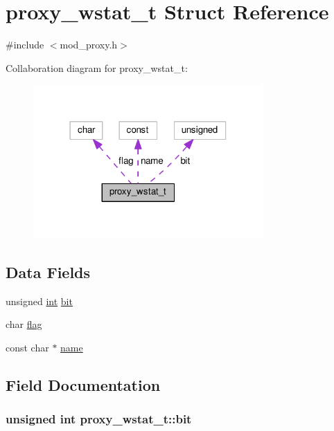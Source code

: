 \hypertarget{structproxy__wstat__t}{}\section{proxy\+\_\+wstat\+\_\+t Struct Reference}
\label{structproxy__wstat__t}


{\ttfamily \#include $<$mod\+\_\+proxy.\+h$>$}



Collaboration diagram for proxy\+\_\+wstat\+\_\+t\+:
\nopagebreak
\begin{figure}[H]
\begin{center}
\leavevmode
\includegraphics[width=249pt]{structproxy__wstat__t__coll__graph}
\end{center}
\end{figure}
\subsection*{Data Fields}
\begin{DoxyCompactItemize}
\item 
unsigned \hyperlink{pcre_8txt_a42dfa4ff673c82d8efe7144098fbc198}{int} \hyperlink{structproxy__wstat__t_a1b59d067162780a135eac2a94b4eef4d}{bit}
\item 
char \hyperlink{structproxy__wstat__t_a7c72e98eb351fdd5e39c7c6dd6f60190}{flag}
\item 
const char $\ast$ \hyperlink{structproxy__wstat__t_a63e450026fda59aed6d9620fb569f320}{name}
\end{DoxyCompactItemize}


\subsection{Field Documentation}
\subsubsection[{\texorpdfstring{bit}{bit}}]{\setlength{\rightskip}{0pt plus 5cm}unsigned {\bf int} proxy\+\_\+wstat\+\_\+t\+::bit}\hypertarget{structproxy__wstat__t_a1b59d067162780a135eac2a94b4eef4d}{}\label{structproxy__wstat__t_a1b59d067162780a135eac2a94b4eef4d}
